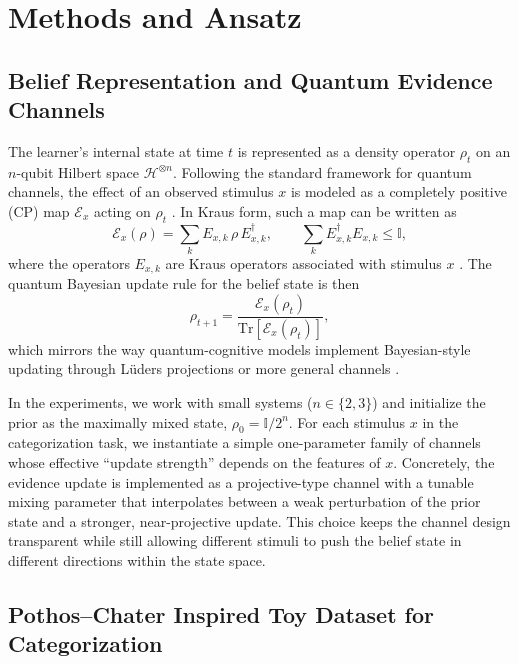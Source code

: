 \documentclass[conference]{IEEEtran}
\begin{document}
\section{Methods and Ansatz}

\subsection{Belief Representation and Quantum Evidence Channels}

The learner’s internal state at time $t$ is represented as a density operator $\rho_t$ on an $n$-qubit Hilbert space $\mathcal{H}^{\otimes n}$. Following the standard framework for quantum channels, the effect of an observed stimulus $x$ is modeled as a completely positive (CP) map $\mathcal{E}_x$ acting on $\rho_t$ \cite{b12,b13}. In Kraus form, such a map can be written as
\begin{equation}
\mathcal{E}_x(\rho) = \sum_k E_{x,k}\, \rho\, E_{x,k}^\dagger,
\qquad 
\sum_k E_{x,k}^\dagger E_{x,k} \le \mathbb{I},
\end{equation}
where the operators $E_{x,k}$ are Kraus operators associated with stimulus $x$ \cite{b12,b13}. The quantum Bayesian update rule for the belief state is then
\begin{equation}
\rho_{t+1} = \frac{\mathcal{E}_x(\rho_t)}{\mathrm{Tr}\!\left[\mathcal{E}_x(\rho_t)\right]},
\end{equation}
which mirrors the way quantum-cognitive models implement Bayesian-style updating through Lüders projections or more general channels \cite{b3,b4,b9}.

In the experiments, we work with small systems ($n \in \{2,3\}$) and initialize the prior as the maximally mixed state, $\rho_{0} = \mathbb{I}/2^n$. For each stimulus $x$ in the categorization task, we instantiate a simple one-parameter family of channels whose effective ``update strength'' depends on the features of $x$. Concretely, the evidence update is implemented as a projective-type channel with a tunable mixing parameter that interpolates between a weak perturbation of the prior state and a stronger, near-projective update. This choice keeps the channel design transparent while still allowing different stimuli to push the belief state in different directions within the state space.

\subsection{Pothos--Chater Inspired Toy Dataset for Categorization}
\label{sec:pc_dataset}
\end{document}
